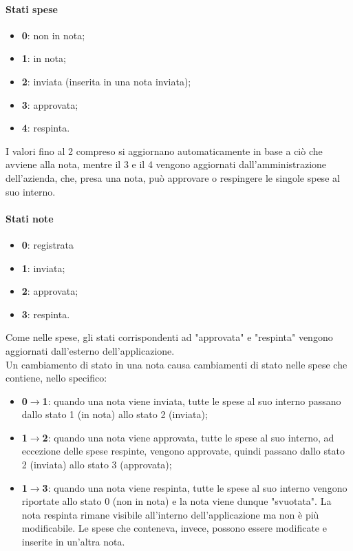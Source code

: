 \paragraph{Stati spese}
\begin{itemize}
    \item \textbf{0}: non in nota;
    \item \textbf{1}: in nota;
    \item \textbf{2}: inviata (inserita in una nota inviata);
    \item \textbf{3}: approvata;
    \item \textbf{4}: respinta.
\end{itemize}

\noindent I valori fino al 2 compreso si aggiornano automaticamente in base a ciò che avviene alla nota, mentre il 3 e il 4 vengono aggiornati dall'amministrazione dell'azienda, che, presa una nota, può approvare o respingere le singole spese al suo interno.

\paragraph{Stati note}
\begin{itemize}
    \item \textbf{0}: registrata
    \item \textbf{1}: inviata;
    \item \textbf{2}: approvata;
    \item \textbf{3}: respinta.
\end{itemize}

\noindent Come nelle spese, gli stati corrispondenti ad "approvata" e "respinta" vengono aggiornati dall'esterno dell'applicazione.\\
Un cambiamento di stato in una nota causa cambiamenti di stato nelle spese che contiene, nello specifico:
\begin{itemize}
    \item \textbf{0$\to$1}: quando una nota viene inviata, tutte le spese al suo interno passano dallo stato 1 (in nota) allo stato 2 (inviata);
    \item \textbf{1$\to$2}: quando una nota viene approvata, tutte le spese al suo interno, ad eccezione delle spese respinte, vengono approvate, quindi passano dallo stato 2 (inviata) allo stato 3 (approvata);
    \item \textbf{1$\to$3}: quando una nota viene respinta, tutte le spese al suo interno vengono riportate allo stato 0 (non in nota) e la nota viene dunque "svuotata". La nota respinta rimane visibile all'interno dell'applicazione ma non è più modificabile. Le spese che conteneva, invece, possono essere modificate e inserite in un'altra nota.
\end{itemize}

